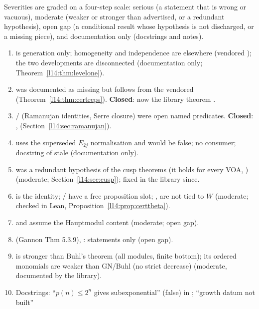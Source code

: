 Severities are graded on a four-step scale: serious (a statement that is wrong or vacuous), moderate (weaker or stronger than advertised, or a redundant
hypothesis), open gap (a conditional result whose hypothesis is not discharged, or a missing piece), and documentation
only (docstrings and notes).
\begin{enumerate}
\item {} is generation only; homogeneity and independence are elsewhere (vendored
  ); the two developments are disconnected (documentation only; Theorem~\ref{l14:thm:levelone}).
\item {} was documented as missing but follows from the vendored 
  (Theorem~\ref{l14:thm:certreps}). \textbf{Closed}: now the library theorem .
\item {} /  (Ramanujan identities, Serre closure) were open named predicates.
  \textbf{Closed}: ,  (Section~\ref{l14:sec:ramanujan}).
\item {} uses the superseded $E_{2j}$ normalisation and would be false; no consumer; docstring of
   stale (documentation only).
\item {} was a redundant hypothesis of the cusp theorems (it holds for every VOA,
  ) (moderate; Section~\ref{l14:sec:cusp}); fixed in the library since.
\item {} is the identity; / have a free
  proposition slot; ,  are not tied to $W$ (moderate; checked in Lean,
  Proposition~\ref{l14:prop:certtheta}).
\item {} and  assume the Hauptmodul content (moderate; open gap).
\item {} (Gannon Thm 5.3.9), : statements only (open gap).
\item {} is stronger than Buhl's theorem (all modules, finite bottom); its ordered monomials are weaker than
  GN/Buhl (no strict decrease) (moderate, documented by the library).
\item Docstrings: ``$p(n)\le2^n$ gives subexponential'' (false) in ; ``growth datum not built''

\end{enumerate}
